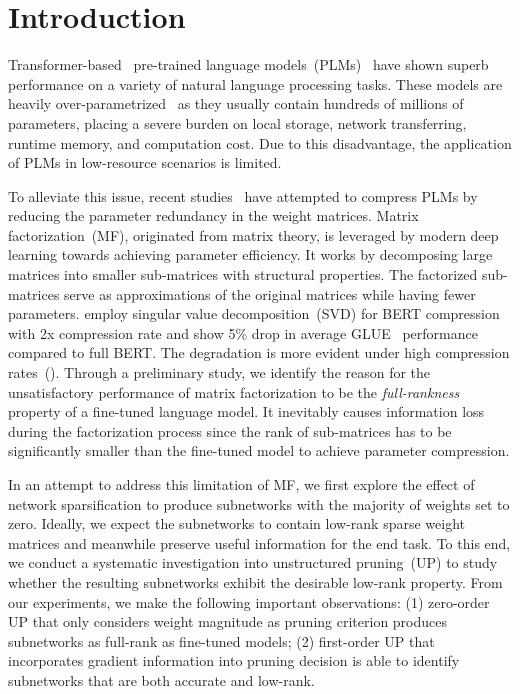 \section{Introduction}

Transformer-based~\cite{transformer} pre-trained language models~(PLMs)~\cite{bert,roberta} have shown superb performance on a variety of natural language processing tasks. These models are heavily over-parametrized~\cite{overpara} as they usually contain hundreds of millions of parameters, placing a severe burden on local storage, network transferring, runtime memory, and computation cost. Due to this disadvantage, the application of PLMs in low-resource scenarios is limited.

To alleviate this issue, recent studies~\cite{l0,svd} have attempted to compress 
PLMs by reducing the parameter redundancy in the weight matrices. Matrix factorization~(MF), originated from matrix theory, is leveraged by modern deep learning towards achieving parameter efficiency. It works by decomposing large matrices into smaller sub-matrices with structural properties. The factorized sub-matrices serve as approximations of the original matrices while having fewer parameters.  \citet{svd} employ singular value decomposition~(SVD) for BERT compression with 2x compression rate and show 5\% drop in average GLUE~\cite{glue} performance compared to full BERT. The degradation is more evident under high compression rates~(). Through a preliminary study, we identify the reason for the unsatisfactory performance of matrix factorization to be the \textit{full-rankness} property of a fine-tuned language model. It inevitably causes information loss during the factorization process since the rank of sub-matrices has to be significantly smaller than the fine-tuned model to achieve parameter compression.


In an attempt to address this limitation of MF, we first explore the effect of network sparsification to produce subnetworks with the majority of weights set to zero. Ideally, we expect the subnetworks to contain low-rank sparse weight matrices and meanwhile preserve useful information for the end task. 
To this end, we conduct a systematic investigation into unstructured pruning~(UP) to study whether the resulting subnetworks exhibit the desirable low-rank property. From our experiments, we make the following important observations: (1) zero-order UP that only considers weight magnitude as pruning criterion produces subnetworks as full-rank as fine-tuned models; (2) first-order UP that incorporates gradient information into pruning decision is able to identify subnetworks that are both accurate and low-rank.


